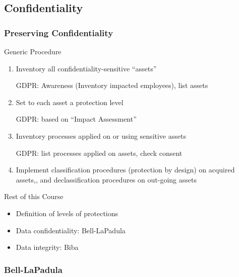 \begin{reveals}
\section{Confidentiality}


\begin{frame}
  \frametitle{Preserving Confidentiality}

  \vfill

  \begin{block}{Generic Procedure}
    \begin{enumerate}
    \item Inventory all confidentiality-sensitive ``assets''
      \begin{center}
        GDPR: Awareness (Inventory impacted employees), list assets
      \end{center}
    \item Set to each asset a protection level
      \begin{center}
        GDPR: based on ``Impact Assessment''
      \end{center}
    \item Inventory processes applied on or using sensitive assets
      \begin{center}
        GDPR: list processes applied on assets, check consent
      \end{center}
    \item Implement classification procedures (protection by design)
      on acquired assets,, and declassification procedures on out-going assets
    \end{enumerate}
  \end{block}

  \vfill

  \begin{block}{Rest of this Course}
    \begin{itemize}
    \item Definition of levels of protections
    \item Data confidentiality: Bell-LaPadula
    \item Data integrity: Biba
    \end{itemize}
  \end{block}

  \vfill

\end{frame}



\begin{frame}
  \frametitle{Bell-LaPadula}


\end{frame}
\end{reveals}
